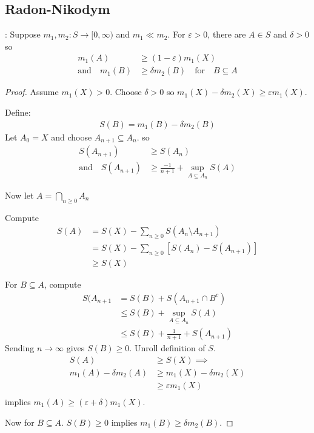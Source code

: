 \subsection{Radon-Nikodym}

\begin{lemma}: Suppose $m_1, m_2 : S \to [0, \infty)$ and $m_1 \ll m_2$.
For $\varepsilon > 0$, there are $A \in S$ and $\delta > 0$ so
\begin{align*}
			m_1 (A) &\geq (1 - \varepsilon) m_1 (X) \\
	\text{and} \quad m_1 (B) &\geq \delta m_2 (B) \quad \text{for} \quad B \subseteq A
\end{align*}
\end{lemma}


\begin{proof}
	Assume $m_1 (X) > 0$. Choose $\delta > 0$ so $m_1 (X) - \delta m_2 (X) \geq \varepsilon m_1 (X)$.

	\noindent Define:
	\begin{align*}
		S (B) = m_1 (B) - \delta m_2 (B)
	\end{align*}
	Let $A_0 = X$ and choose  $A_{n+1} \subseteq A_{n}$. so
	\begin{align*}
		S( A_{n + 1} ) &\geq S (A_{n}) \\
		\text{and} \quad S(A_{n+1} ) &\geq \frac{-1}{n+1} + \sup_{A \subseteq A_{n}	} S (A)
	\end{align*}

	Now let $A = \bigcap_{n \geq 0} A_n$

	Compute
	\begin{align*}
		S(A) &= S(X) - \sum_{n \geq 0} S( A_n \setminus A_{n+1} ) \\
			 &= S(X) - \sum_{n \geq 0} [S(A_{n}) - S(A_{n+1} ) ] \\
			 &\geq S(X)
	\end{align*}

	For $B \subseteq A$, compute
	\begin{align*}
		S(A_{n + 1} &= S(B) + S(A_{n+1} \cap B^c ) \\
					&\leq S(B) + \sup_{A \subseteq A_{n}} S(A) \\
					&\leq S(B) + \frac{1}{n+1} + S(A_{n+1} )
	\end{align*} Sending $n \to \infty$ gives $S(B) \geq 0$. Unroll definition of $S$.
	\begin{align*}
		S(A) &\geq S(X) \implies \\
		m_1 (A) - \delta m_2 (A) &\geq m_1 (X) - \delta m_2 (X) \\
								 &\geq \varepsilon m_1 (X) \\
	\end{align*} implies $m_1 (A) \geq ( \varepsilon + \delta) m_1 (X)$.

	Now for $B \subseteq A$. $S(B) \geq 0$ implies $m_1 (B) \geq \delta m_2 (B)$.
\end{proof}


